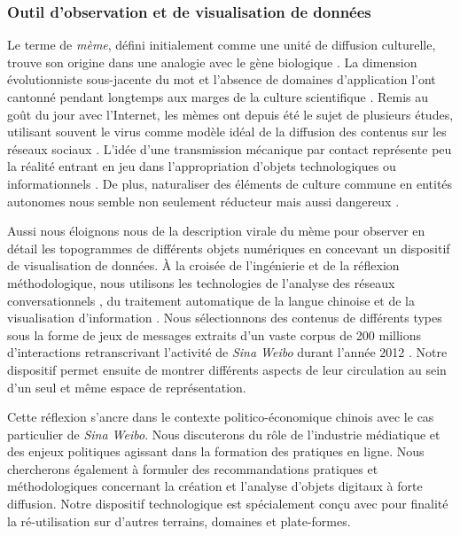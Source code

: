 \subsubsection{Outil d'observation et de visualisation de données}

Le terme de \textit{mème}, défini initialement comme une unité de diffusion culturelle, trouve son origine dans une analogie avec le gène biologique \citep{Dawkins1989, Blackmore2001}. La dimension évolutionniste sous-jacente du mot et l'absence de domaines d'application l'ont cantonné pendant longtemps aux marges de la culture scientifique \citep{Jouxtel2014}. Remis au goût du jour avec l'Internet, les mèmes ont depuis été le sujet de plusieurs études, utilisant souvent le virus comme modèle idéal de la diffusion des contenus sur les réseaux sociaux \citep{Leskovec2005, Adamic2014}. L'idée d'une transmission mécanique par contact représente peu la réalité entrant en jeu dans l'appropriation d'objets technologiques \citep{Orlikowski1993} ou informationnels \citep{Certeau1980}. De plus, naturaliser des éléments de culture commune en entités autonomes nous semble non seulement réducteur mais aussi dangereux \citep{Elias1975}.

Aussi nous éloignons nous de la description virale du mème pour observer en détail les topogrammes de différents objets numériques en concevant un dispositif de visualisation de données. À la croisée de l'ingénierie et de la réflexion méthodologique, nous utilisons les technologies de l'analyse des réseaux conversationnels \citep{Weng2012}, du traitement automatique de la langue chinoise \citep{Xue2003} et de la visualisation d'information \citep{Cairo2012}. Nous sélectionnons des contenus de différents types sous la forme de jeux de messages extraits d'un vaste corpus de 200 millions d'interactions retranscrivant l'activité de \textit{Sina Weibo} durant l'année 2012 \citep{Fu2013}. Notre dispositif permet ensuite de montrer différents aspects de leur circulation au sein d'un seul et même espace de représentation.

Cette réflexion s'ancre dans le contexte politico-économique chinois avec le cas particulier de \textit{Sina Weibo}. Nous discuterons du rôle de l'industrie médiatique et des enjeux politiques agissant dans la formation des pratiques en ligne. Nous chercherons également à formuler des recommandations pratiques et méthodologiques concernant la création et l'analyse d'objets digitaux à forte diffusion. Notre dispositif technologique est spécialement conçu avec pour finalité la ré-utilisation sur d'autres terrains, domaines et plate-formes.


